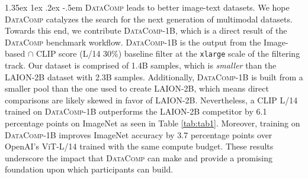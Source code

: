 \documentclass[dvipsnames,11pt]{article}
\makeatletter
\renewcommand\paragraph{\@startsection{paragraph}{4}{\z@}                                     {1.35ex \@plus1ex \@minus.2ex}                                {-.5em}
{\normalfont\normalsize\bfseries}}
\newcommand{\datanet}{\textsc{DataComp}\xspace}
\newcommand{\users}{participants\xspace}
\newcommand{\ours}{\textsc{DataComp}-1B\xspace}
\makeatother
\begin{document}
\paragraph{\datanet leads to better image-text datasets.}
We hope \datanet catalyzes the search for the next generation of multimodal datasets. Towards this end, we contribute \ours, which is a direct result of the \datanet benchmark workflow. \ours is the output from the Image-based $\cap$ CLIP score (L/14 30\%) baseline filter at the {\small \texttt{xlarge}} scale of the filtering track.
Our dataset is comprised of 1.4B samples, which is \emph{smaller} than the LAION-2B dataset with 2.3B samples.
Additionally, \ours is built from a smaller pool than the one used to create LAION-2B, which means direct comparisons are likely skewed in favor of LAION-2B.
Nevertheless, a CLIP L/14 trained on \ours outperforms the LAION-2B competitor by 6.1 percentage points on ImageNet as seen in Table \ref{tab:tab1}. Moreover, training on \ours improves ImageNet accuracy by 3.7 percentage points over OpenAI's ViT-L/14 trained with the same compute budget. These results underscore the impact that \datanet can make and provide a promising foundation upon which \users can build.
\end{document}
